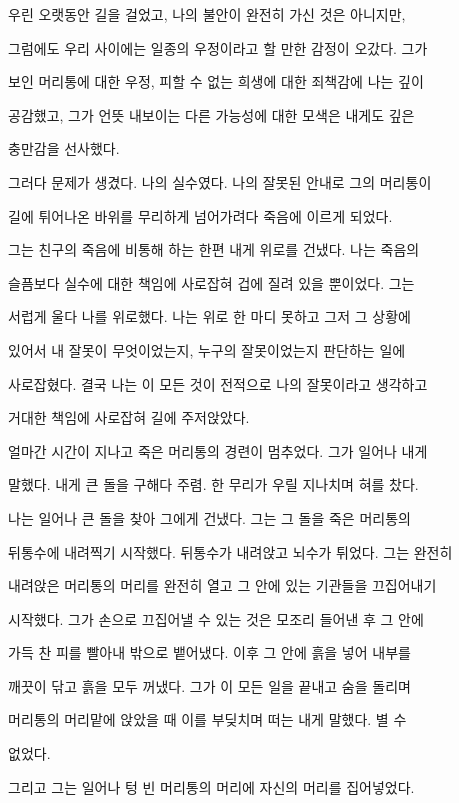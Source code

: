 우린 오랫동안 길을 걸었고, 나의 불안이 완전히 가신 것은 아니지만,

그럼에도 우리 사이에는 일종의 우정이라고 할 만한 감정이 오갔다. 그가

보인 머리통에 대한 우정, 피할 수 없는 희생에 대한 죄책감에 나는 깊이

공감했고, 그가 언뜻 내보이는 다른 가능성에 대한 모색은 내게도 깊은

충만감을 선사했다.



그러다 문제가 생겼다. 나의 실수였다. 나의 잘못된 안내로 그의 머리통이

길에 튀어나온 바위를 무리하게 넘어가려다 죽음에 이르게 되었다.



그는 친구의 죽음에 비통해 하는 한편 내게 위로를 건냈다. 나는 죽음의

슬픔보다 실수에 대한 책임에 사로잡혀 겁에 질려 있을 뿐이었다. 그는

서럽게 울다 나를 위로했다. 나는 위로 한 마디 못하고 그저 그 상황에

있어서 내 잘못이 무엇이었는지, 누구의 잘못이었는지 판단하는 일에

사로잡혔다. 결국 나는 이 모든 것이 전적으로 나의 잘못이라고 생각하고

거대한 책임에 사로잡혀 길에 주저앉았다.



얼마간 시간이 지나고 죽은 머리통의 경련이 멈추었다. 그가 일어나 내게

말했다. 내게 큰 돌을 구해다 주렴. 한 무리가 우릴 지나치며 혀를 찼다.

나는 일어나 큰 돌을 찾아 그에게 건냈다. 그는 그 돌을 죽은 머리통의

뒤통수에 내려찍기 시작했다. 뒤통수가 내려앉고 뇌수가 튀었다. 그는 완전히

내려앉은 머리통의 머리를 완전히 열고 그 안에 있는 기관들을 끄집어내기

시작했다. 그가 손으로 끄집어낼 수 있는 것은 모조리 들어낸 후 그 안에

가득 찬 피를 빨아내 밖으로 뱉어냈다. 이후 그 안에 흙을 넣어 내부를

깨끗이 닦고 흙을 모두 꺼냈다. 그가 이 모든 일을 끝내고 숨을 돌리며

머리통의 머리맡에 앉았을 때 이를 부딪치며 떠는 내게 말했다. 별 수

없었다.



그리고 그는 일어나 텅 빈 머리통의 머리에 자신의 머리를 집어넣었다.

